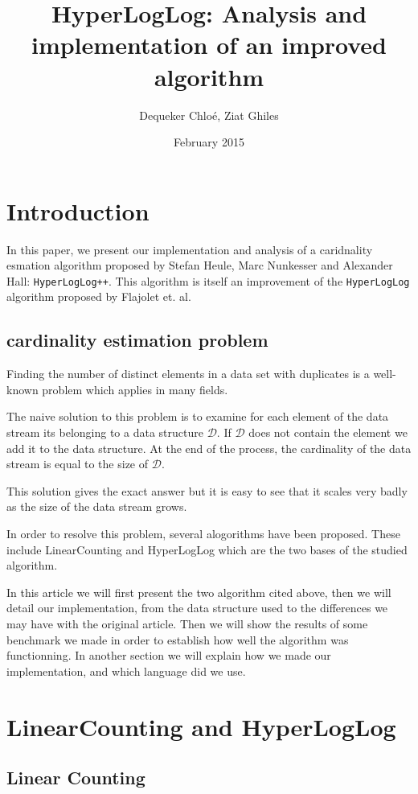 \documentclass{article}
\title{HyperLogLog: Analysis and implementation of an improved algorithm}
\author{Dequeker Chlo\'e, Ziat Ghiles}
\date{February 2015}
\begin{document}
\maketitle
\clearpage

\tableofcontents
\clearpage

\section{Introduction}
In this paper, we present our implementation and analysis of a
caridnality esmation algorithm proposed by Stefan Heule, Marc
Nunkesser and Alexander Hall: \texttt{HyperLogLog++}. This algorithm
is itself an improvement of the \texttt{HyperLogLog} algorithm
proposed by Flajolet et. al.

\subsection{cardinality estimation problem}
Finding the number of distinct elements in a data set with duplicates
is a well-known problem which applies in many fields.

The naive solution to this problem is to examine for each element of
the data stream its belonging to a data structure $\mathcal{D}$. If
$\mathcal{D}$ does not contain the element we add it to the data
structure. At the end of the process, the cardinality of the data
stream is equal to the size of $\mathcal{D}$.

This solution gives the exact answer but it is easy to see that it
scales very badly as the size of the data stream grows.

In order to resolve this problem, several alogorithms have been
proposed. These include LinearCounting and HyperLogLog which are the two
bases of the studied algorithm.

In this article we will first present the two algorithm cited above,
then we will detail our implementation, from the data structure used
to the differences we may have with the original article. Then we will
show the results of some benchmark we made in order to establish how
well the algorithm was functionning. In another section we will
explain how we made our implementation, and which language did we use.

\clearpage
\section{LinearCounting and HyperLogLog}
\subsection{Linear Counting}
\end{document}
